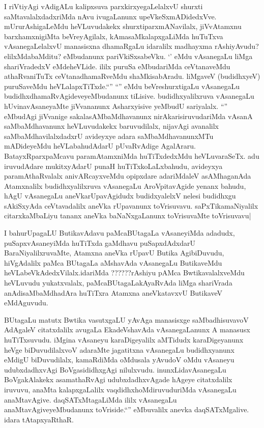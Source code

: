 \begin{artha}
I riVtiyAgi vAdigALu kalipxsuva parxkirxyegaLelalxvU shurxti
saMtavalalxdadxriMda nAvu ivugaLanunx
upeVkeSxmADidedxVve. mUrurAshigaLeMdu heVLuvudakekx
shurxtiparxmANavilalx, jiVvAtamxnu barxhamxnigiMta beVreyAgilalx,
kAmasaMkalapxgaLiMda huTuTxva vAsanegaLelalxvU manasisxna dhamaRgaLu
idaralilx madhayxma rAshiyAvudu? elilxMdabaMditu? eMbudanunx
pariVkiSxsabeVku. `\stext' eMdu vAsanegaLu liMga shariVradedxV
eMdeheVLide. ililx puruSa eMbudariMda ceVtanaveMdu athaRvaniTuTx
ceVtanadhamaRveMdu shaMkisabAradu. liMgaveV (budidhxyeV) puruSaveMdu
heVLalapxTiTxde.``\stext'' ``\stext'' eMdu  beVreshurxtigaLu
vAsanegaLu budidhxdhamaRvAgideveyeMbudanunx
tiLisive. budidhxyalilxruva vAsanegaLu hUvinavAsaneyaMte jiVvananunx
Asharxyisive yeMbudU sariyalalx. ``\stext'' eMbudAgi jiVvanige
sakalasAMbaMdhavanunx nirAkarisiruvudariMda vAsanA saMbaMdhavanunx
heVLuvudakekx baruvudilalx, nijavAgi avanalilx saMbaMdhavilalxdadxrU
avideyxye adara saMbaMdhavanunxMTu mADideyeMdu heVLabahudAdarU
pUvaRvAdige AgalAraru. BatayxRparxpaMcavu paramAtamxniMda
huTiTxdedxMdu heVLuvaraSeTx. adu iruvudAdare mukitxyAdarU punaH
huTiTxkoLaLxbahudu, avideyxya paramAthaRvalalx anivARcayxveMdu
opipxdare adariMdaleV asAMhaganAda Atamxnalilx budidhxyalilxruva
vAsanegaLu AroVpitavAgide yenanx bahudu, hAgU vAsanegaLu
aneVkarUpavAgidudx budidxyalelxV nelesi budidhxgu sAkiSxyAda
ceVtavadalilx aneVka rUpavanunx toVrisuvavu. saPxTikamaNiyalilx
citarxkaMbaLiyu tananx aneVka baNaNxgaLanunx toVrisuvaMte toVrisuvavu|
\end{artha}

\begin{artha}
I bahurUpagaLU ButikavAdavu paMcaBUtagaLa vAsaneyiMda adadudx,
puSapxvAsaneyiMda huTiTxda gaMdhavu puSapxdAdxdarU
BaraNiyalilxruvaMte, Atamxna aneVka rUpavU Butika AgibiDuvudu,
hiVgAdalilx paMca BUtagaLa aMshavAda vAsanegaLu ButikaveMdu
heVLabeVkAdedxVilalx.idariMda ??????rAshiyu pAMca BwtikavalalxveMdu
heVLuvudu yukatxvalalx, paMcaBUtagaLakAyaRvAda liMga shariVrada
anAdisaMbaMdhadAra huTiTxra Atamxna aneVkatavxvU ButikaveV eMdAguvudu.
\end{artha}

\begin{center}


\end{center}

\begin{artha}
BUtagaLu matutx Bwtika vasutxgaLU yAvAga manasisxge saMbadhisuvavoV
AdAgaleV citatxdalilx avugaLa EkadeVshavAda vAsanegaLanunx A manasusx
huTiTxsuvudu. iMgina vAsaneyu karaDigeyalilx aMTidudx karaDigeyanunx
heVge biDuvudilalxvoV adaraMte jagatitxna vAsanegaLu budidhxyanunx
eMdigU biDuvudilalx, kamaRdiMda oMdusala yAvudoV oMdu vAsaneyu
udubxdadhxvAgi BoVgasididhxgAgi nilulxvudu. inunxLidavAsanegaLu
BoVgakAlakekx asamathaRvAgi udubxdadhxvAgade hAgeye citatxdalilx
iruvuvu, anaMta kalapxgaLalilx vaqdidhxhoMdiruvuduriMda vAsanegaLu
anaMtavAgive. daqSATxMtagaLiMda ililx vAsanegaLu
anaMtavAgiveyeMbudanunx toVriside.``\stext'' eMbuvalilx anevka
daqSATxMgalive. idara tAtapxyaRthaR.
\end{artha}

